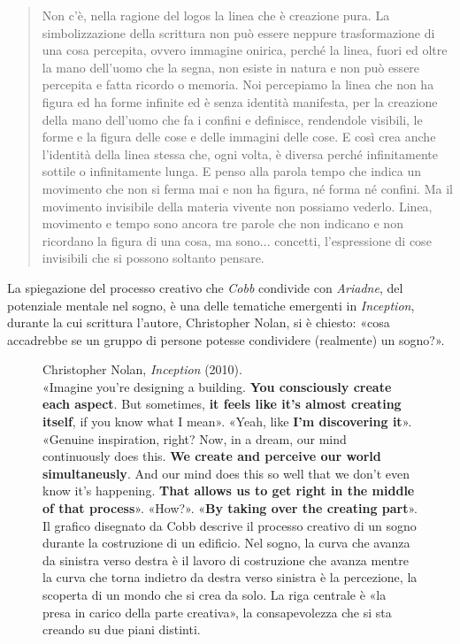 \begin{quote}
  Non c’è, nella ragione del logos la linea che è creazione pura. La
  simbolizzazione della scrittura non può essere neppure trasformazione di una
  cosa percepita, ovvero immagine onirica, perché la linea, fuori ed oltre la
  mano dell’uomo che la segna, non esiste in natura e non può essere percepita
  e fatta ricordo o memoria. Noi percepiamo la linea che non ha figura ed ha
  forme infinite ed è senza identità manifesta, per la creazione della mano
  dell’uomo che fa i confini e definisce, rendendole visibili, le forme e la
  figura delle cose e delle immagini delle cose. E così crea anche l’identità
  della linea stessa che, ogni volta, è diversa perché infinitamente sottile o
  infinitamente lunga. E penso alla parola tempo che indica un movimento che
  non si ferma mai e non ha figura, né forma né confini. Ma il movimento
  invisibile della materia vivente non possiamo vederlo. Linea, movimento e
  tempo sono ancora tre parole che non indicano e non ricordano la figura
  di una cosa, ma sono... concetti, l’espressione di cose invisibili che si
  possono soltanto pensare. \cite{mf:left2008}
\end{quote}

La spiegazione del processo creativo che \emph{Cobb} condivide con
\emph{Ariadne}, del potenziale mentale nel sogno, è una delle tematiche
emergenti in \emph{Inception}, durante la cui scrittura l'autore, Christopher
Nolan, si è chiesto: «cosa accadrebbe se un gruppo di persone potesse
condividere (realmente) un sogno?».

\begin{figure}[ht]
\centering
\caption{Christopher Nolan, \emph{Inception} (2010).\\
         «Imagine you're designing a building. \textbf{You consciously create
         each aspect}. But sometimes,
         \textbf{it feels like it's almost creating itself}, if you know what I
         mean». «Yeah, like \textbf{I'm discovering it}». «Genuine inspiration,
         right? Now, in a dream, our mind continuously does this.
         \textbf{We create and perceive our world simultaneusly}. And our mind
         does this so well that we don't even know it's happening.
         \textbf{That allows us to get right in the middle of that process}».
         «How?». «\textbf{By taking over the creating part}».
         Il grafico disegnato da Cobb descrive il processo creativo di un sogno
         durante la costruzione di un edificio. Nel sogno, la curva che avanza
         da sinistra verso destra è il lavoro di costruzione che avanza mentre
         la curva che torna indietro da destra verso sinistra è la percezione,
         la scoperta di un mondo che si crea da solo. La riga centrale è «la
         presa in carico della parte creativa», la consapevolezza che si sta
         creando su due piani distinti.}
\label{tikz:inception}
\end{figure}

